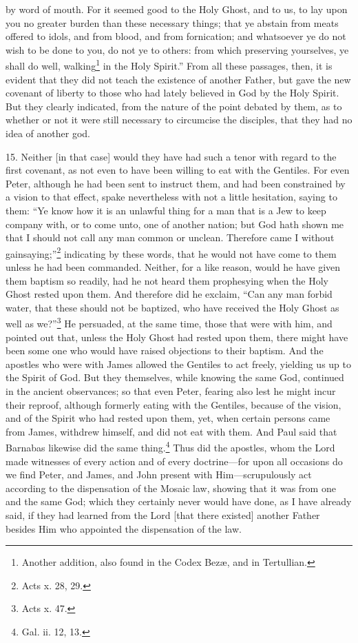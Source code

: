 by word of mouth. For it seemed good to the Holy Ghost, and to us, to lay upon you no greater burden than these necessary things; that ye abstain from meats offered to idols, and from blood, and from fornication; and whatsoever ye do not wish to be done to you, do not ye to others: from which preserving yourselves, ye shall do well, walking\footnote{Another addition, also found in the Codex Bezæ, and in Tertullian.} in the Holy Spirit.” From all these passages, then, it is evident that they did not teach the existence of another Father, but gave the new covenant of liberty to those who had lately believed in God by the Holy Spirit. But they clearly indicated, from the nature of the point debated by them, as to whether or not it were still necessary to circumcise the disciples, that they had no idea of another god.

15. Neither [in that case] would they have had such a tenor with regard to the first covenant, as not even to have been willing to eat with the Gentiles. For even Peter, although he had been sent to instruct them, and had been constrained by a vision to that effect, spake nevertheless with not a little hesitation, saying to them: “Ye know how it is an unlawful thing for a man that is a Jew to keep company with, or to come unto, one of another nation; but God hath shown me that I should not call any man common or unclean. Therefore came I without gainsaying;”\footnote{Acts x. 28, 29.} indicating by these words, that he would not have come to them unless he had been commanded. Neither, for a like reason, would he have given them baptism so readily, had he not heard them prophesying when the Holy Ghost rested upon them. And therefore did he exclaim, “Can any man forbid water, that these should not be baptized, who have received the Holy Ghost as well as we?”\footnote{Acts x. 47.} He persuaded, at the same time, those that were with him, and pointed out that, unless the Holy Ghost had rested upon them, there might have been some one who would have raised objections to their baptism. And the apostles who were with James allowed the Gentiles to act freely, yielding us up to the Spirit of God. But they themselves, while knowing the same God, continued in the ancient observances; so that even Peter, fearing also lest he might incur their reproof, although formerly eating with the Gentiles, because of the vision, and of the Spirit who had rested upon them, yet, when certain persons came from James, withdrew himself, and did not eat with them. And Paul said that Barnabas likewise did the same thing.\footnote{Gal. ii. 12, 13.} Thus did the apostles, whom the Lord made witnesses of every action and of every doctrine—for upon all occasions do we find Peter, and James, and John present with Him—scrupulously act according to the dispensation of the Mosaic law, showing that it was from one and the same God; which they certainly never would have done, as I have already said, if they had learned from the Lord [that there existed] another Father besides Him who appointed the dispensation of the law.

